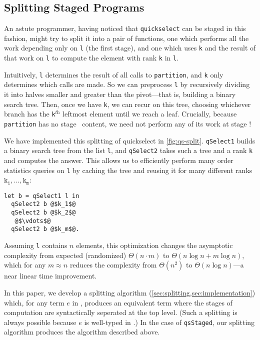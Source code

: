 \begin{concretesyntax}
\subsection{Splitting Staged Programs}



An astute programmer, having noticed that \texttt{quickselect} can be staged in
this fashion, might try to split it into a pair of functions, one which performs
all the work depending only on \texttt{l} (the first stage), and one which uses
\texttt{k} and the result of that work on \texttt{l} to compute the element with
rank \texttt{k} in \texttt{l}. 

Intuitively, \texttt{l} determines the result of all calls to
\texttt{partition}, and \texttt{k} only determines which calls are made. So we
can preprocess \texttt{l} by recursively dividing it into halves smaller and
greater than the pivot---that is, building a binary search tree. Then, once we
have \texttt{k}, we can recur on this tree, choosing whichever branch has the
\texttt{k}${}^\textit{th}$ leftmost element until we reach a leaf. Crucially,
because \texttt{partition} has no stage \bbtwo\ content, we need not perform any
of its work at stage \bbtwo!


We have implemented this splitting of quickselect in \ref{fig:qs-split}.
\texttt{qSelect1} builds a binary search tree from the list \texttt{l}, and
\texttt{qSelect2} takes such a tree and a rank \texttt{k} and computes the
answer. This allows us to efficiently perform many order statistics queries on
\texttt{l} by caching the tree and reusing it for many different ranks
$\mathtt{k_1},\dots,\mathtt{k_m}$:
%
\begin{lstlisting}
let b = qSelect1 l in
  qSelect2 b @$k_1$@
  qSelect2 b @$k_2$@
   @$\vdots$@ 
  qSelect2 b @$k_m$@.
\end{lstlisting}

Assuming \texttt{l} contains $n$ elements, this optimization changes the
asymptotic complexity from expected (randomized) $\Theta(n \cdot m)$ to
$\Theta(n\log{n} + m\log{n})$, which for any $m \approx n$ reduces the
complexity from $\Theta (n^2)$ to $\Theta(n\log{n})$---a near linear time
improvement. 

In this paper, we develop a splitting algorithm
(\ref{sec:splitting,sec:implementation}) which, for any term $e$ in \lang,
produces an equivalent term where the stages of computation 
are syntactically seperated at the top level.
(Such a splitting is always possible because $e$ is well-typed in \lang.) In the
case of \texttt{qsStaged}, our splitting algorithm produces the algorithm
described above.


\end{concretesyntax}
